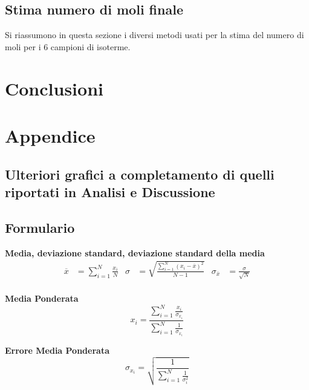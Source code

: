 \documentclass[a4paper,11pt,oneside]{article}
\begin{document}
\subsection{Stima numero di moli finale}
Si riassumono in questa sezione i diversi metodi usati per la stima del numero di moli per i 6 campioni di isoterme.


\section{Conclusioni}

\newpage
\section{Appendice}
\subsection{Ulteriori grafici a completamento di quelli riportati in Analisi e Discussione}
\subsection{Formulario}
\textbf{Media, deviazione standard, deviazione standard della media}
\begin{align*}
        \overline{x}&=\sum\limits_{i=1}^{N} \frac{x_{i}}{N}&
        \sigma&=\sqrt{\frac{\sum\limits_{i=1}^{N} (x_{i}-\overline{x})^2}{N-1}}&
        \sigma_{\overline{x}}&=\frac{\sigma}{\sqrt{N}}
\end{align*}\\

\textbf{Media Ponderata}
\begin{equation*}
\label{eq:media_pond}
    x_i=\frac{\sum_{i=1}^{N}\frac{x_i}{\sigma_{x_i}}}{\sum_{i=1}^{N}\frac{1}{\sigma_{x_i}}}
\end{equation*}

\textbf{Errore Media Ponderata}
\begin{equation*}
\label{eq:errore_media_pond}
     \sigma_{x_i}=\sqrt{\frac{1}{\sum_{i=1}^{N}\frac{1}{\sigma_{i}^{2}}}}
\end{equation*}
\end{document}
